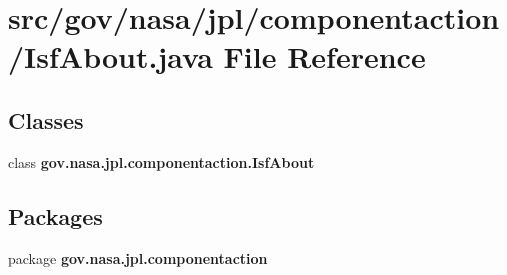 \section{src/gov/nasa/jpl/componentaction/\+Isf\+About.java File Reference}
\label{_isf_about_8java}
\subsection*{Classes}
\begin{DoxyCompactItemize}
\item 
class {\bf gov.\+nasa.\+jpl.\+componentaction.\+Isf\+About}
\end{DoxyCompactItemize}
\subsection*{Packages}
\begin{DoxyCompactItemize}
\item 
package {\bf gov.\+nasa.\+jpl.\+componentaction}
\end{DoxyCompactItemize}
